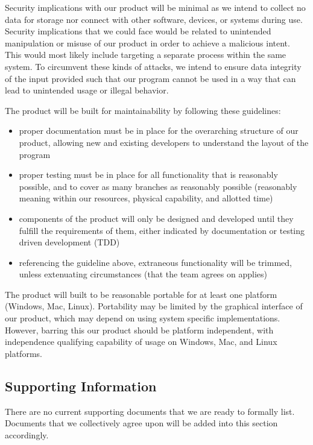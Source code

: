 \documentclass[10pt,letter,draftclsnofoot,onecolumn]{IEEEtran}
\begin{document}
\begin{singlespace}
        
        Security implications with our product will be minimal as we intend to collect no data for storage nor connect with other software, devices, or systems during use. Security implications that we could face would be related to unintended manipulation or misuse of our product in order to achieve a malicious intent. This would most likely include targeting a separate process within the same system. To circumvent these kinds of attacks, we intend to ensure data integrity of the input provided such that our program cannot be used in a way that can lead to unintended usage or illegal behavior.
        
        
        The product will be built for maintainability by following these guidelines:
        \begin{itemize}
            \item proper documentation must be in place for the overarching structure of our product, allowing new and existing developers to understand the layout of the program
            \item proper testing must be in place for all functionality that is reasonably possible, and to cover as many branches as reasonably possible (reasonably meaning within our resources, physical capability, and allotted time)
            \item components of the product will only be designed and developed until they fulfill the requirements of them, either indicated by documentation or testing driven development (TDD)
            \item referencing the guideline above, extraneous functionality will be trimmed, unless extenuating circumstances (that the team agrees on applies)
        \end{itemize}
        
        
        The product will built to be reasonable portable for at least one platform (Windows, Mac, Linux). Portability may be limited by the graphical interface of our product, which may depend on using system specific implementations. However, barring this our product should be platform independent, with independence qualifying capability of usage on Windows, Mac, and Linux platforms.
    \subsection{Supporting Information}
        There are no current supporting documents that we are ready to formally list. Documents that we collectively agree upon will be added into this section accordingly.


\end{singlespace}
\end{document}
